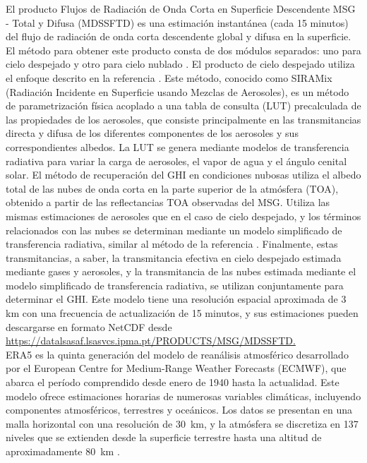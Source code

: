 El producto Flujos de Radiación de Onda Corta en Superficie Descendente MSG - Total y Difusa (MDSSFTD) es una estimación instantánea (cada 15 minutos) del flujo de radiación de onda corta descendente global y difusa en la superficie. El método para obtener este producto consta de dos módulos separados: uno para cielo despejado y otro para cielo nublado \citep{Derrien2005,nwc-2014}. El producto de cielo despejado utiliza el enfoque descrito en la referencia \citep{Ceamanos2014}. Este método, conocido como SIRAMix (Radiación Incidente en Superficie usando Mezclas de Aerosoles), es un método de parametrización física acoplado a una tabla de consulta (LUT) precalculada de las propiedades de los aerosoles, que consiste principalmente en las transmitancias directa y difusa de los diferentes componentes de los aerosoles y sus correspondientes albedos. La LUT se genera mediante modelos de transferencia radiativa para variar la carga de aerosoles, el vapor de agua y el ángulo cenital solar. El método de recuperación del GHI en condiciones nubosas utiliza el albedo total de las nubes de onda corta en la parte superior de la atmósfera (TOA), obtenido a partir de las reflectancias TOA observadas del MSG. Utiliza las mismas estimaciones de aerosoles que en el caso de cielo despejado, y los términos relacionados con las nubes se determinan mediante un modelo simplificado de transferencia radiativa, similar al método de la referencia \citep{Geiger2008}. Finalmente, estas transmitancias, a saber, la transmitancia efectiva en cielo despejado estimada mediante gases y aerosoles, y la transmitancia de las nubes estimada mediante el modelo simplificado de transferencia radiativa, se utilizan conjuntamente para determinar el GHI. Este modelo tiene una resolución espacial aproximada de 3 km con una frecuencia de actualización de 15 minutos, y sus estimaciones pueden descargarse en formato NetCDF desde \url{https://datalsasaf.lsasvcs.ipma.pt/PRODUCTS/MSG/MDSSFTD.}\\


ERA5 es la quinta generación del modelo de reanálisis atmosférico desarrollado por el European Centre for Medium-Range Weather Forecasts (ECMWF), que abarca el período comprendido desde enero de 1940 hasta la actualidad. Este modelo ofrece estimaciones horarias de numerosas variables climáticas, incluyendo componentes atmosféricos, terrestres y oceánicos. Los datos se presentan en una malla horizontal con una resolución de $30$~km, y la atmósfera se discretiza en 137 niveles que se extienden desde la superficie terrestre hasta una altitud de aproximadamente $80$~km \citep{era-5}. 

